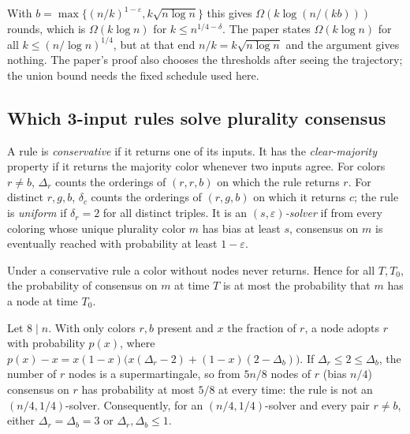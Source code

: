 \begin{remark}
  With $b = \max\{(n/k)^{1-\varepsilon}, k\sqrt{n\log n}\}$ this gives
  $\Omega(k\log(n/(kb)))$ rounds, which is $\Omega(k\log n)$ for
  $k \le n^{1/4-\delta}$. The paper states $\Omega(k\log n)$ for all
  $k \le (n/\log n)^{1/4}$, but at that end $n/k = k\sqrt{n\log n}$ and the
  argument gives nothing. The paper's proof also chooses the thresholds after
  seeing the trajectory; the union bound needs the fixed schedule used here.
\end{remark}

\subsection{Which 3-input rules solve plurality consensus}

\begin{definition}\label{def:good_rules}
  \leanok
  A rule is \emph{conservative} if it returns one of its inputs. It has the
  \emph{clear-majority} property if it returns the majority color whenever two
  inputs agree. For colors $r \ne b$, $\Delta_r$ counts the orderings of
  $(r,r,b)$ on which the rule returns $r$. For distinct $r,g,b$, $\delta_c$
  counts the orderings of $(r,g,b)$ on which it returns $c$; the rule is
  \emph{uniform} if $\delta_r = 2$ for all distinct triples. It is an
  \emph{$(s,\varepsilon)$-solver} if from every coloring whose unique plurality
  color $m$ has bias at least $s$, consensus on $m$ is eventually reached with
  probability at least $1-\varepsilon$.
\end{definition}

\begin{lemma}\label{lem:alive}
  \leanok
  Under a conservative rule a color without nodes never returns. Hence for all
  $T, T_0$, the probability of consensus on $m$ at time $T$ is at most the
  probability that $m$ has a node at time $T_0$.
\end{lemma}

\begin{theorem}\label{thm:4_8_a}
  \leanok
  Let $8 \mid n$. With only colors $r, b$ present and $x$ the fraction of $r$,
  a node adopts $r$ with probability $p(x)$, where
  $p(x) - x = x(1-x)\bigl(x(\Delta_r - 2) + (1-x)(2 - \Delta_b)\bigr)$. If
  $\Delta_r \le 2 \le \Delta_b$, the number of $r$ nodes is a supermartingale,
  so from $5n/8$ nodes of $r$ (bias $n/4$) consensus on $r$ has probability at
  most $5/8$ at every time: the rule is not an $(n/4, 1/4)$-solver.
  Consequently, for an $(n/4, 1/4)$-solver and every pair $r \ne b$, either
  $\Delta_r = \Delta_b = 3$ or $\Delta_r, \Delta_b \le 1$.
\end{theorem}

